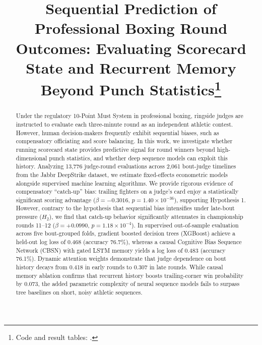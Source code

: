 \documentclass[conference]{IEEEtran}
\begin{document}
\title{Sequential Prediction of Professional Boxing Round Outcomes: Evaluating Scorecard State and Recurrent Memory Beyond Punch Statistics\thanks{Code and result tables: \repolink.}}

\author{
}

\maketitle

\begin{abstract}
Under the regulatory 10-Point Must System in professional boxing, ringside judges are instructed to evaluate each three-minute round as an independent athletic contest. However, human decision-makers frequently exhibit sequential biases, such as compensatory officiating and score balancing. In this work, we investigate whether running scorecard state provides predictive signal for round winners beyond high-dimensional punch statistics, and whether deep sequence models can exploit this history. Analyzing 13,776 judge-round evaluations across 2,061 bout-judge timelines from the Jabbr DeepStrike dataset, we estimate fixed-effects econometric models alongside supervised machine learning algorithms. We provide rigorous evidence of compensatory ``catch-up'' bias: trailing fighters on a judge's card enjoy a statistically significant scoring advantage ($\beta = -0.3016$, $p = 1.40 \times 10^{-36}$), supporting Hypothesis 1. However, contrary to the hypothesis that sequential bias intensifies under late-bout pressure ($H_2$), we find that catch-up behavior significantly attenuates in championship rounds 11--12 ($\beta = +0.0990$, $p = 1.18 \times 10^{-4}$). In supervised out-of-sample evaluation across five bout-grouped folds, gradient boosted decision trees (XGBoost) achieve a held-out log loss of 0.468 (accuracy 76.7\%), whereas a causal Cognitive Bias Sequence Network (CBSN) with gated LSTM memory yields a log loss of 0.483 (accuracy 76.1\%). Dynamic attention weights demonstrate that judge dependence on bout history decays from 0.418 in early rounds to 0.307 in late rounds. While causal memory ablation confirms that recurrent history boosts trailing-corner win probability by 0.073, the added parametric complexity of neural sequence models fails to surpass tree baselines on short, noisy athletic sequences.
\end{abstract}
\end{document}

